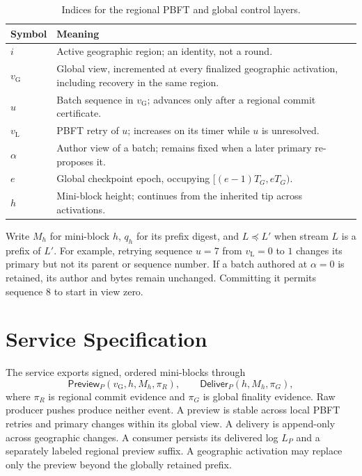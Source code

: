 \documentclass[11pt,a4paper,onecolumn]{article}
\newcommand{\gv}{v_{\mathrm G}}
\newcommand{\lv}{v_{\mathrm L}}
\newcommand{\pre}{\preceq}
\newcommand{\Tag}[1]{\mathsf{#1}}
\theoremstyle{remark}\newtheorem{example}[definition]{Example}
\begin{document}
\begin{table}[htbp]\centering\small
\begin{tabularx}{\textwidth}{@{}p{}Y@{}}\toprule
Symbol & Meaning\\\midrule
$i$ & Active geographic region; an identity, not a round.\\
$\gv$ & Global view, incremented at every finalized geographic activation,
including recovery in the same region.\\
$u$ & Batch sequence in $\gv$; advances only after a regional commit certificate.\\
$\lv$ & PBFT retry of $u$; increases on its timer while $u$ is unresolved.\\
$\alpha$ & Author view of a batch; remains fixed when a later primary re-proposes it.\\
$e$ & Global checkpoint epoch, occupying $[(e-1)T_G,eT_G)$.\\
$h$ & Mini-block height; continues from the inherited tip across activations.\\\bottomrule
\end{tabularx}
\caption{Indices for the regional PBFT and global control layers.}
\end{table}
Write $M_h$ for mini-block $h$, $q_h$ for its prefix digest, and $L\pre L'$
when stream $L$ is a prefix of $L'$. For example, retrying sequence $u=7$
from $\lv=0$ to $1$ changes its primary but not its parent or sequence number.
If a batch authored at $\alpha=0$ is retained, its author and bytes remain
unchanged. Committing it permits sequence $8$ to start in view zero.

\section{Service Specification}\label{sec:spec}
The service exports signed, ordered mini-blocks through
\[
 \Tag{Preview}_P(\gv,h,M_h,\pi_R),\qquad
 \Tag{Deliver}_P(h,M_h,\pi_G),
\]
where $\pi_R$ is regional commit evidence and $\pi_G$ is global finality evidence.
Raw producer pushes produce neither event. A preview is stable across local
PBFT retries and primary changes within its global view. A delivery is
append-only across geographic changes. A consumer persists its delivered log
$L_P$ and a separately labeled regional preview suffix. A geographic activation
may replace only the preview beyond the globally retained prefix.
\end{document}
